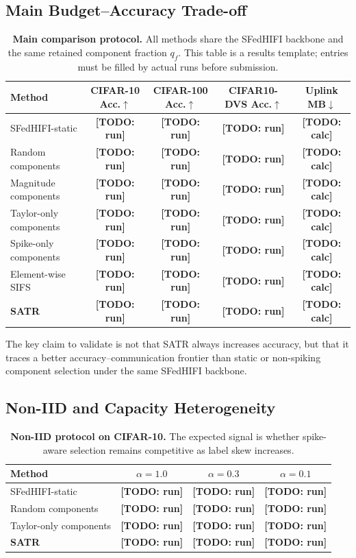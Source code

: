 \documentclass{article} %
\newcommand{\method}{SATR\xspace}
\newcommand{\methodbf}{\textbf{SATR}}
\newcommand{\todo}[1]{{\color{red}\textbf{[TODO: #1]}}}
\begin{document}
\subsection{Main Budget--Accuracy Trade-off}
\label{sec:exp-main}

\begin{table}[t]
\centering
\caption{\textbf{Main comparison protocol.} All methods share the SFedHIFI backbone and the same retained component fraction $q_f$. This table is a results template; entries must be filled by actual runs before submission.}
\label{tab:main-iid}
\small
\begin{tabular}{lcccc}
\toprule
Method & CIFAR-10 Acc.$\uparrow$ & CIFAR-100 Acc.$\uparrow$ & CIFAR10-DVS Acc.$\uparrow$ & Uplink MB$\downarrow$ \\
\midrule
SFedHIFI-static & \todo{run} & \todo{run} & \todo{run} & \todo{calc} \\
Random components & \todo{run} & \todo{run} & \todo{run} & \todo{calc} \\
Magnitude components & \todo{run} & \todo{run} & \todo{run} & \todo{calc} \\
Taylor-only components & \todo{run} & \todo{run} & \todo{run} & \todo{calc} \\
Spike-only components & \todo{run} & \todo{run} & \todo{run} & \todo{calc} \\
Element-wise SIFS & \todo{run} & \todo{run} & \todo{run} & \todo{calc} \\
\midrule
\methodbf & \todo{run} & \todo{run} & \todo{run} & \todo{calc} \\
\bottomrule
\end{tabular}
\end{table}

The key claim to validate is not that \method always increases accuracy, but that it traces a better accuracy--communication frontier than static or non-spiking component selection under the same SFedHIFI backbone.

\subsection{Non-IID and Capacity Heterogeneity}
\label{sec:exp-noniid}

\begin{table}[t]
\centering
\caption{\textbf{Non-IID protocol on CIFAR-10.} The expected signal is whether spike-aware selection remains competitive as label skew increases.}
\label{tab:noniid}
\small
\begin{tabular}{lccc}
\toprule
Method & $\alpha{=}1.0$ & $\alpha{=}0.3$ & $\alpha{=}0.1$ \\
\midrule
SFedHIFI-static & \todo{run} & \todo{run} & \todo{run} \\
Random components & \todo{run} & \todo{run} & \todo{run} \\
Taylor-only components & \todo{run} & \todo{run} & \todo{run} \\
\methodbf & \todo{run} & \todo{run} & \todo{run} \\
\bottomrule
\end{tabular}
\end{table}
\end{document}
